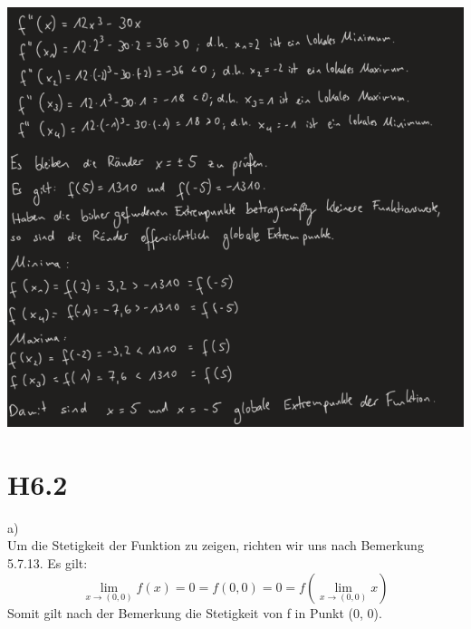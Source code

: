 \documentclass{article}
\begin{document}
\includegraphics[scale=0.6]{ h1_2 }
\section{H6.2}
\noindent a) \\
Um die Stetigkeit der Funktion zu zeigen, richten wir uns nach Bemerkung 
5.7.13. Es gilt:
\[
    \lim\limits_{x \to (0, 0)} f(x) = 0 = f(0,0) = 0 = f(\lim\limits_{x \to (0, 0)} x)
\]
Somit gilt nach der Bemerkung die Stetigkeit von f in Punkt (0, 0).
\end{document}
